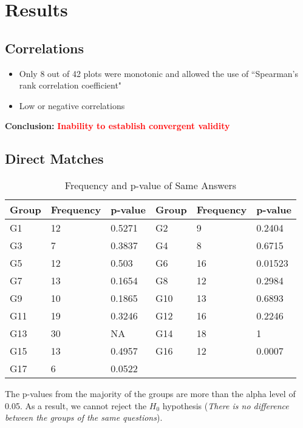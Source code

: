 \section{Results}

\subsection{Correlations}

\begin{itemize}
	\item Only 8 out of 42 plots were monotonic and allowed the use of  ``Spearman's rank correlation coefficient"
	\item Low or negative correlations
\end{itemize}

\textbf{Conclusion:} \textcolor{red}{\textbf{Inability to establish convergent validity}}

\clearpage

\subsection{Direct Matches} 

\begin{table} [H]
	\begin{tabular}{| p{1cm} | p{1.5cm} | p{1.5cm} | p{2cm} | p{1.5cm} | p{1.5cm} |} \hline
		Group & Frequency & p-value & Group & Frequency & p-value \\ \hline
		G1 & 12 & 0.5271 & G2 & 9 & 0.2404 \\ \hline
		G3 & 7 & 0.3837 & G4 & 8 & 0.6715 \\ \hline
		G5 & 12 & 0.503 & G6 & 16 & 0.01523 \\ \hline
		G7 & 13 & 0.1654 & G8 & 12 & 0.2984 \\ \hline
		G9 & 10 & 0.1865 & G10 & 13 & 0.6893 \\ \hline
		G11 & 19 & 0.3246 & G12 & 16 & 0.2246 \\ \hline
		G13 & 30 & NA & G14 & 18 & 1 \\ \hline
		G15 & 13 & 0.4957 & G16 & 12 & 0.0007 \\ \hline
		G17 & 6 & 0.0522 & & & \\ \hline
	\end{tabular}
	\caption{Frequency and p-value of Same Answers}
	\label{table:answers_frequency}
\end{table}

The p-values from the majority of the groups are more than the alpha level of 0.05. As a result, we cannot reject the $H_0$ hypothesis ({\scriptsize \textit{There is no difference between the groups of the same questions}}).

